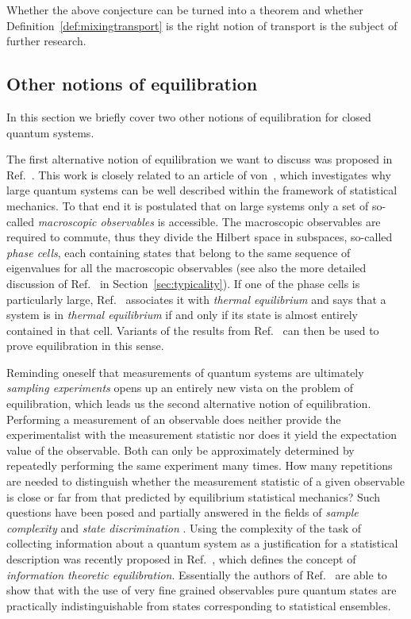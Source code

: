 \documentclass[a4paper,12pt,listof=totoc,index=totoc,bibliography=totoc,headsepline=false,headings=normal,BCOR16.153846mm,DIV12,headinclude,twoside,cleardoublepage=empty,numbers=noenddot,final]{scrreprt}
\theoremstyle{mystyle}
\numberwithin{equation}{section}
\numberwithin{figure}{section}
\numberwithin{lemma}{section}
\numberwithin{theorem}{section}
\numberwithin{corollary}{section}
\numberwithin{definition}{section}
\numberwithin{conjecture}{section}
\numberwithin{observation}{section}
\newcommand{\+}{\mkern2mu}
\DeclareMathOperator{\1}{\mathds{1}}
\begin{document}
Whether the above conjecture can be turned into a theorem and whether Definition~\ref{def:mixingtransport} is the right notion of transport is the subject of further research.


\subsection{Other notions of equilibration}
\label{sec:othernotionsofequilibration}
%
In this section we briefly cover two other notions of equilibration for closed quantum systems.

The first alternative notion of equilibration we want to discuss was proposed in Ref.~\cite{0907.0108v1}.
This work is closely related to an article of von~\textcite{vonneumann1929}, which investigates why large quantum systems can be well described within the framework of statistical mechanics.
To that end it is postulated that on large systems only a set of so-called \emph{macroscopic observables} is accessible. 
The macroscopic observables are required to commute, thus they divide the Hilbert space in subspaces, so-called \emph{phase cells}, each containing states that belong to the same sequence of eigenvalues for all the macroscopic observables (see also the more detailed discussion of Ref.~\cite{vonneumann1929} in Section~\ref{sec:typicality}).
If one of the phase cells is particularly large, Ref.~\cite{0907.0108v1} associates it with \emph{thermal equilibrium} and says that a system is in \emph{thermal equilibrium} if and only if its state is almost entirely contained in that cell.
Variants of the results from Ref.~\cite{vonneumann1929} can then be used to prove equilibration in this sense.

Reminding oneself that measurements of quantum systems are ultimately \emph{sampling experiments} opens up an entirely new vista on the problem of equilibration, which leads us the second alternative notion of equilibration.
Performing a measurement of an observable does neither provide the experimentalist with the measurement statistic nor does it yield the expectation value of the observable.
Both can only be approximately determined by repeatedly performing the same experiment many times.
How many repetitions are needed to distinguish whether the measurement statistic of a given observable is close or far from that predicted by equilibrium statistical mechanics?
Such questions have been posed and partially answered in the fields of \emph{sample complexity} \cite{Batu2001,Batu2000,Canonne2012} and \emph{state discrimination} \cite{Audenaert2012,Audenaert2012a}.
Using the complexity of the task of collecting information about a quantum system as a justification for a statistical description was recently proposed in Ref.~\cite{Ududec2012}, which defines the concept of \emph{information theoretic equilibration}.
Essentially the authors of Ref.~\cite{Ududec2012} are able to show that with the use of very fine grained observables pure quantum states are practically indistinguishable from states corresponding to statistical ensembles.
\end{document}
